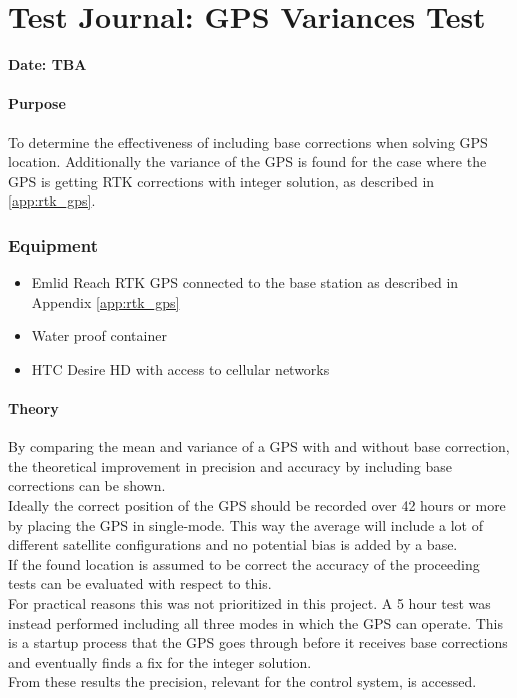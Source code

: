 \chapter{Test Journal: GPS Variances Test} \label{app:GPSImprovement}

\textbf{Date: TBA}

\subsubsection*{Purpose}
To determine the effectiveness of including base corrections when solving GPS location. Additionally the variance of the GPS is found for the case where the GPS is getting RTK corrections with integer solution, as described in \autoref{app:rtk_gps}.

\subsection*{Equipment}
\begin{itemize}
	\item Emlid Reach RTK GPS connected to the base station as described in Appendix \ref{app:rtk_gps}
  \item Water proof container
  \item HTC Desire HD with access to cellular networks
\end{itemize}

\subsubsection*{Theory}
By comparing the mean and variance of a GPS with and without base correction, the theoretical improvement in precision and accuracy by including base corrections can be shown.\\
Ideally the correct position of the GPS should be recorded over 42 hours or more by placing the GPS in single-mode. This way the average will include a lot of different satellite configurations and no potential bias is added by a base.\\
If the found location is assumed to be correct the accuracy of the proceeding tests can be evaluated with respect to this.\\
For practical reasons this was not prioritized in this project. A 5 hour test was instead performed including all three modes in which the GPS can operate. This is a startup process that the GPS goes through before it receives base corrections and eventually finds a fix for the integer solution.\\
From these results the precision, relevant for the control system, is accessed.


